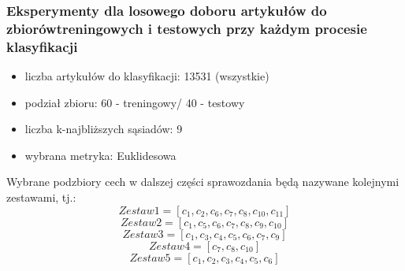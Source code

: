 \documentclass{classrep}
\begin{document}
\subsubsection {Eksperymenty dla losowego doboru artykułów do zbiorówtreningowych i testowych przy każdym procesie klasyfikacji}
\begin{itemize}
    \item liczba artykułów do klasyfikacji: 13531 (wszystkie)
    \item podział zbioru: 60 - treningowy/ 40 - testowy    
    \item liczba k-najbliższych sąsiadów: 9 
    \item wybrana metryka: Euklidesowa
\end{itemize}
Wybrane podzbiory cech w dalszej części sprawozdania będą nazywane kolejnymi zestawami, tj.:
\begin{equation}
   Zestaw1 = [c_{1}, c_{2}, c_{6}, c_{7}, c_{8}, c_{10}, c_{11}]
\end{equation}
\begin{equation}
   Zestaw2 = [c_{1}, c_{5}, c_{6}, c_{7}, c_{8}, c_{9}, c_{10}]
\end{equation}
\begin{equation}
   Zestaw3 = [c_{1}, c_{3}, c_{4}, c_{5}, c_{6}, c_{7}, c_{9}]
\end{equation}
\begin{equation}
   Zestaw4 = [c_{7}, c_{8}, c_{10}]
\end{equation}
\begin{equation}
   Zestaw5 = [c_{1}, c_{2}, c_{3}, c_{4}, c_{5}, c_{6}]
\end{equation}
\end{document}
